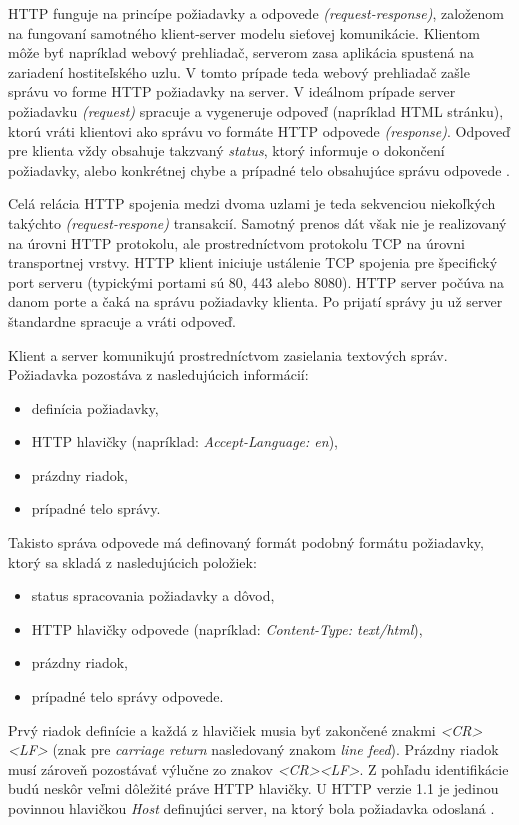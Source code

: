 \documentclass[
  printed, %
  table,   %
  lof,     %
  nolot,   %
  nocover
]{fithesis3}
\begin{document}
HTTP funguje na princípe požiadavky a odpovede \textit{(request-response)},
založenom na fungovaní samotného klient-server modelu sieťovej komunikácie. Klientom môže byť
napríklad webový prehliadač, serverom zasa aplikácia spustená na zariadení
hostiteľského uzlu. V tomto prípade teda webový prehliadač zašle správu vo
forme HTTP požiadavky na server. V ideálnom prípade server požiadavku
\textit{(request)} spracuje a vygeneruje odpoveď (napríklad HTML stránku),
ktorú vráti klientovi ako správu vo formáte HTTP odpovede \textit{(response)}.
Odpoveď pre klienta vždy obsahuje takzvaný \textit{status}, ktorý informuje o
dokončení požiadavky, alebo konkrétnej chybe a prípadné telo obsahujúce správu odpovede \cite{rfc1123}.

Celá relácia HTTP spojenia medzi dvoma uzlami je teda sekvenciou niekoľkých
takýchto \textit{(request-respone)} transakcií. Samotný prenos dát však nie
je realizovaný na úrovni HTTP protokolu, ale prostredníctvom protokolu TCP
na úrovni transportnej vrstvy. HTTP klient iniciuje ustálenie TCP spojenia pre
špecifický port serveru (typickými portami sú 80, 443 alebo 8080). HTTP server
počúva na danom porte a čaká na správu požiadavky klienta. Po prijatí správy ju
už server štandardne spracuje a vráti odpoveď. 

Klient a server komunikujú prostredníctvom zasielania textových správ.
Požiadavka pozostáva z nasledujúcich informácií: 
\begin{itemize}
	\item definícia požiadavky,
	\item HTTP hlavičky (napríklad: \textit{Accept-Language: en}),
	\item prázdny riadok,
	\item prípadné telo správy.
\end{itemize}

Takisto správa odpovede má definovaný formát podobný formátu požiadavky, ktorý
sa skladá z nasledujúcich položiek:
\begin{itemize}
	\item status spracovania požiadavky a dôvod,
	\item HTTP hlavičky odpovede (napríklad: \textit{Content-Type: text/html}),
	\item prázdny riadok,
	\item prípadné telo správy odpovede.
\end{itemize}

Prvý riadok definície a každá z hlavičiek musia byť zakončené znakmi
\textit{<CR><LF>}
(znak pre \textit{carriage return} nasledovaný znakom \textit{line feed}).
Prázdny riadok musí zároveň pozostávať výlučne zo znakov \textit{<CR><LF>}.
Z pohľadu identifikácie budú neskôr veľmi dôležité práve HTTP hlavičky. U HTTP
verzie 1.1 je jedinou povinnou hlavičkou \textit{Host} definujúci server, na
ktorý bola požiadavka odoslaná \cite{Berners:2010:HTTP}.
\end{document}
